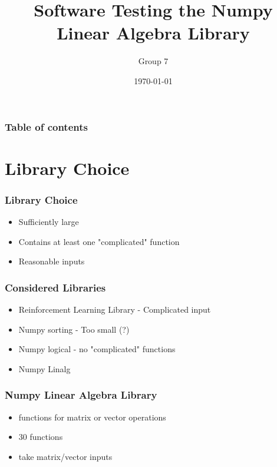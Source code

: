\documentclass{beamer}
\begin{document}
\title{Software Testing the Numpy Linear Algebra Library}  
\author{Group 7}

\date{\today} 
\begin{frame}
\titlepage
\end{frame}

\begin{frame}\frametitle{Table of contents}\tableofcontents
\end{frame} 

\section{Library Choice}
\begin{frame}
\frametitle{Library Choice} 
\begin{itemize}
\item Sufficiently large\\
\item Contains at least one "complicated" function\\
\item Reasonable inputs \\
\end{itemize}
\end{frame}

\begin{frame}\frametitle{Considered Libraries} 
\begin{itemize}
\item Reinforcement Learning Library - Complicated input 
\item Numpy sorting - Too small (?)
\item Numpy logical - no "complicated" functions 
\item Numpy Linalg
\end{itemize}
\end{frame}


\begin{frame}\frametitle{Numpy Linear Algebra Library} 
\begin{itemize}

\item functions for matrix or vector operations 
\item 30 functions
\item take matrix/vector inputs
\end{itemize}
\end{frame}
\end{document}
